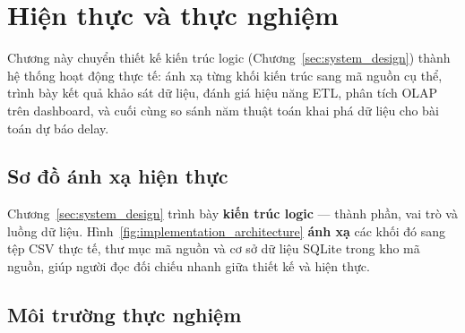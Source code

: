\clearpage
\section{Hiện thực và thực nghiệm}
\label{sec:implementation_experiment}

Chương này chuyển thiết kế kiến trúc logic (Chương~\ref{sec:system_design}) thành hệ thống
hoạt động thực tế: ánh xạ từng khối kiến trúc sang mã nguồn cụ thể,
trình bày kết quả khảo sát dữ liệu, đánh giá hiệu năng ETL,
phân tích OLAP trên dashboard, và cuối cùng so sánh năm thuật toán khai phá dữ liệu
cho bài toán dự báo delay.

\subsection{Sơ đồ ánh xạ hiện thực}

Chương~\ref{sec:system_design} trình bày \textbf{kiến trúc logic} --- thành phần, vai trò
và luồng dữ liệu. Hình~\ref{fig:implementation_architecture} \textbf{ánh xạ} các khối đó
sang tệp CSV thực tế, thư mục mã nguồn và cơ sở dữ liệu SQLite trong kho mã nguồn,
giúp người đọc đối chiếu nhanh giữa thiết kế và hiện thực.



\subsection{Môi trường thực nghiệm}

